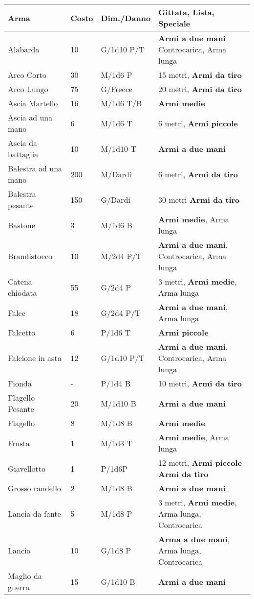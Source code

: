 \documentclass[12pt,a4paper,twoside,openany]{book}
\begin{document}
\begin{xltabular}{0.99\textwidth}{lllX}
\textbf{Arma}&\textbf{Costo}&\textbf{Dim./Danno} & \textbf{Gittata, Lista, Speciale}\\
\toprule
Alabarda& 10 & G/1d10 P/T& \textbf{Armi a due mani} Controcarica, Arma lunga \\
Arco Corto& 30 & M/1d6 P& 15 metri, \textbf{Armi da tiro}\\
Arco Lungo& 75 & G/Frecce& 20 metri, \textbf{Armi da tiro}\\
Ascia Martello& 16 & M/1d6 T/B& \textbf{Armi medie}\\
Ascia ad una mano& 6  & M/1d6 T& 6 metri, \textbf{Armi piccole}\\
Ascia da battaglia& 10 & M/1d10 T&\textbf{Armi a due mani}\\
Balestra ad una mano& 200& M/Dardi& 6 metri, \textbf{Armi da tiro}\\
Balestra pesante& 150 & G/Dardi& 30 metri \textbf{Armi da tiro}\\
Bastone& 3& M/1d6 B& \textbf{Armi medie}, Arma lunga\\
Brandistocco& 10 & M/2d4 P/T& \textbf{Armi a due mani}, Controcarica, Arma lunga\\
Catena chiodata& 55 & G/2d4 P& 3 metri, \textbf{Armi medie}, Arma lunga\\
Falce& 18 & G/2d4 P/T& \textbf{Armi a due mani}, Arma lunga\\
Falcetto& 6& P/1d6 T& \textbf{Armi piccole}\\
Falcione in asta& 12 & G/1d10 P/T& \textbf{Armi a due mani}, Controcarica, Arma lunga\\
Fionda& -& P/1d4 B& 10 metri, \textbf{Armi da tiro}\\
Flagello Pesante& 20 & M/1d10 B& \textbf{Armi a due mani}\\
Flagello& 8& M/1d8 B& \textbf{Armi medie}\\
Frusta& 1& M/1d3 T& \textbf{Armi medie}, Arma lunga\\
Giavellotto& 1& P/1d6P& 12 metri,  \textbf{Armi piccole} \textbf{Armi da tiro}\\
Grosso randello& 2& M/1d8 B&\textbf{Armi a due mani}\\
Lancia da fante& 5& M/1d8 P&3 metri, \textbf{Armi medie}, Arma lunga, Controcarica\\
Lancia& 10 & G/1d8 P&\textbf{Arma a due mani}, Arma lunga, Controcarica\\
Maglio da guerra& 15& G/1d10 B& \textbf{Armi a due mani}\\

\end{xltabular}
\end{document}
